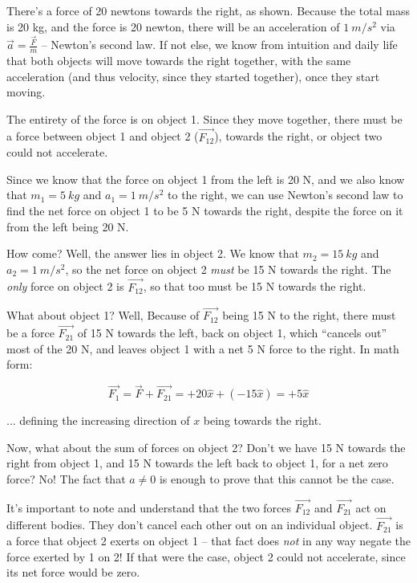 \documentclass[12pt,a4paper]{report}
\begin{document}
There's a force of 20 newtons towards the right, as shown. Because the total mass is 20 kg, and the force is 20 newton, there will be an acceleration of $\SI{1}{m/s^2}$ via $\displaystyle \vec{a} = \frac{\vec{F}}{m}$ -- Newton's second law. If not else, we know from intuition and daily life that both objects will move towards the right together, with the same acceleration (and thus velocity, since they started together), once they start moving.

The entirety of the force is on object 1. Since they move together, there must be a force between object 1 and object 2 ($\vec{F_{12}}$), towards the right, or object two could not accelerate.

Since we know that the force on object 1 from the left is 20 N, and we also know that $m_1 = \SI{5}{kg}$ and $a_1 = \SI{1}{m/s^2}$ to the right, we can use Newton's second law to find the net force on object 1 to be 5 N towards the right, despite the force on it from the left being 20 N.

How come? Well, the answer lies in object 2. We know that $m_2 = \SI{15}{kg}$ and $a_2 = \SI{1}{m/s^2}$, so the net force on object 2 \emph{must} be 15 N towards the right. The \emph{only} force on object 2 is $\vec{F_{12}}$, so that too must be 15 N towards the right.

What about object 1? Well, Because of $\vec{F_{12}}$ being 15 N to the right, there must be a force $\vec{F_{21}}$ of 15 N towards the left, back on object 1, which ``cancels out'' most of the 20 N, and leaves object 1 with a net 5 N force to the right. In math form:

\begin{equation}
\vec{F_1} = \vec{F} + \vec{F_{21}} = +20\hat{x} + (-15\hat{x}) = +5 \hat{x}
\end{equation}

... defining the increasing direction of $x$ being towards the right.

Now, what about the sum of forces on object 2? Don't we have 15 N towards the right from object 1, and 15 N towards the left back to object 1, for a net zero force? No! The fact that $a \neq 0$ is enough to prove that this cannot be the case.

It's important to note and understand that the two forces $\vec{F_{12}}$ and $\vec{F_{21}}$ act on different bodies. They don't cancel each other out on an individual object. $\vec{F_{21}}$ is a force that object 2 exerts on object 1 -- that fact does \emph{not} in any way negate the force exerted by 1 on 2! If that were the case, object 2 could not accelerate, since its net force would be zero.
\end{document}
